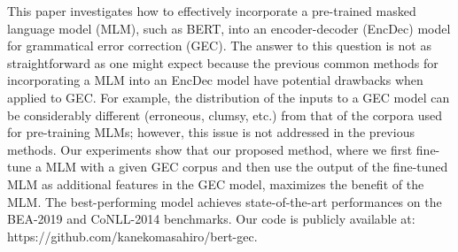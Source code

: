 This paper investigates how to effectively incorporate a pre-trained masked language model (MLM), such as BERT, into an encoder-decoder (EncDec) model for grammatical error correction (GEC). The answer to this question is not as straightforward as one might expect because the previous common methods for incorporating a MLM into an EncDec model have potential drawbacks when applied to GEC. For example, the distribution of the inputs to a GEC model can be considerably different (erroneous, clumsy, etc.) from that of the corpora used for pre-training MLMs; however, this issue is not addressed in the previous methods. Our experiments show that our proposed method, where we first fine-tune a MLM with a given GEC corpus and then use the output of the fine-tuned MLM as additional features in the GEC model, maximizes the benefit of the MLM. The best-performing model achieves state-of-the-art performances on the BEA-2019 and CoNLL-2014 benchmarks. Our code is publicly available at: https://github.com/kanekomasahiro/bert-gec.

